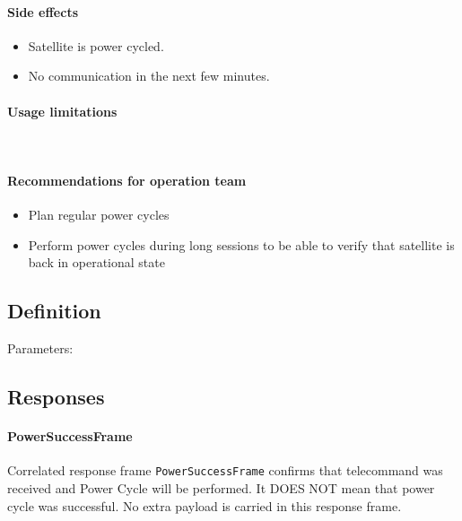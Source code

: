\paragraph{Side effects}
\begin{itemize}
	\item Satellite is power cycled. 
	\item No communication in the next few minutes.
\end{itemize}

\paragraph{Usage limitations}\mbox{}\\ 
\None

\paragraph{Recommendations for operation team}
\begin{itemize}
	\item Plan regular power cycles
	\item Perform power cycles during long sessions to be able to verify that satellite is back in operational state
\end{itemize}


\subsection{Definition}

Parameters: 

\begin{tcarglist}
\end{tcarglist}


\subsection{Responses}

\paragraph{PowerSuccessFrame}
Correlated response frame \texttt{PowerSuccessFrame} confirms that telecommand was received and Power Cycle will be performed. It DOES NOT mean that power cycle was successful. No extra payload is carried in this response frame.

